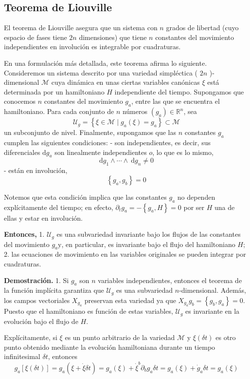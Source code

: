 \subsection{Teorema de Liouville}
El teorema de Liouville asegura que un sistema con $n$ grados de libertad (cuyo espacio de fases tiene $2 n$ dimensiones) que tiene $n$ constantes del movimiento independientes en involución es integrable por cuadraturas.

En una formulación más detallada, este teorema afirma lo siguiente. Consideremos un sistema descrito por una variedad simpléctica ( $2 n$ )-dimensional $\mathscr{M}$ cuya dinámica en unas ciertas variables canónicas $\xi$ está determinada por un hamiltoniano $H$ independiente del tiempo. Supongamos que conocemos $n$ constantes del movimiento $g_{a}$, entre las que se encuentra el hamiltoniano. Para cada conjunto de $n$ números $\left(g_{a}\right) \in \mathbb{R}^{n}$, sea
$$
\mathscr{U}_{g}=\left\{\xi \in \mathscr{M} \mid g_{a}(\xi)=g_{a}\right\} \subset \mathscr{M}
$$
un subconjunto de nivel. Finalmente, supongamos que las $n$ constantes $g_{a}$ cumplen las siguientes condiciones:
- son independientes, es decir, sus diferenciales $\mathrm{d} g_{a}$ son linealmente independientes $o$, lo que es lo mismo,
$$
\mathrm{d} g_{1} \wedge \cdots \wedge \mathrm{~d} g_{n} \neq 0
$$
- están en involución,
$$
\left\{g_{a}, g_{b}\right\}=0
$$

Notemos que esta condición implica que las constantes $g_{a}$ no dependen explícitamente del tiempo; en efecto, $\partial_{t} g_{a}=-\left\{g_{a}, H\right\}=0$ por ser $H$ una de ellas y estar en involución.

\textbf{Entonces,}
1. $\mathscr{U}_{g}$ es una subvariedad invariante bajo los flujos de las constantes del movimiento $g_{a} \mathrm{y}$, en particular, es invariante bajo el flujo del hamiltoniano $H$;
2. las ecuaciones de movimiento en las variables originales se pueden integrar por cuadraturas.

\textbf{Demostración.}
1. Si $g_{a}$ son $n$ variables independientes, entonces el teorema de la función implícita garantiza que $\mathscr{U}_{g}$ es una subvariedad $n$-dimensional. Además, los campos vectoriales $X_{g_{a}}$ preservan esta variedad ya que $X_{g_{a}} g_{b}=\left\{g_{b}, g_{a}\right\}=0$. Puesto que el hamiltoniano es función de estas variables, $\mathscr{U}_{g}$ es invariante en la evolución bajo el flujo de $H$.

Explícitamente, si $\xi$ es un punto arbitrario de la variedad $\mathscr{M}$ y $\xi(\delta t)$ es otro punto obtenido mediante la evolución hamiltoniana durante un tiempo infinitesimal $\delta t$, entonces
$$
g_{a}[\xi(\delta t)]=g_{a}(\xi+\dot{\xi} \delta t)=g_{a}(\xi)+\dot{\xi}^{b} \partial_{b} g_{a} \delta t=g_{a}(\xi)+\dot{g}_{a} \delta t=g_{a}(\xi)
$$

